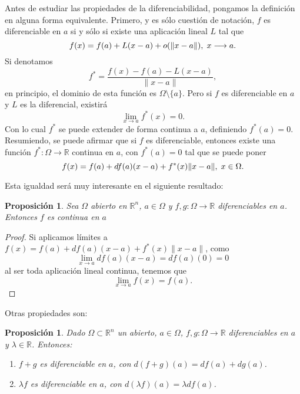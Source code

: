 \documentclass[12pt]{article}
\newtheorem{proposition}[theorem]{Proposición}
\providecommand{\norm}[1]{\lVert#1\rVert}
\begin{document}
Antes de estudiar las propiedades de la diferenciabilidad, pongamos la definición en alguna forma equivalente. Primero, y es sólo cuestión de notación, $f$ es diferenciable en $a$ si y sólo si existe una aplicación lineal $L$ tal que $$f(x)=f(a)+L(x-a)+o(\norm{x-a}), \hspace{0.1cm} x \longrightarrow a.$$
Si denotamos $$f^{\ast} = \dfrac{f(x)-f(a)-L(x-a)}{\norm{x-a}},$$ en principio, el dominio de esta función es $\Omega \setminus \lbrace a \rbrace$. Pero si $f$ es diferenciable en $a$ y $L$ es la diferencial, existirá $$\lim_{x \rightarrow a} f^{\ast}(x) = 0.$$ 
Con lo cual $f^{\ast}$ se puede extender de forma continua a $a$, definiendo $f^{\ast}(a)=0$. Resumiendo, se puede afirmar que si $f$ es diferenciable, entonces existe una función $f^{\ast} \colon \Omega \longrightarrow \mathbb{R}$ continua en $a$, con $f^{\ast}(a)=0$ tal que se puede poner $$f(x) = f(a) + df(a)(x-a) + f^{\ast}(x)\norm{x-a}, \hspace{0.1cm} x \in \Omega.$$

Esta igualdad será muy interesante en el siguiente resultado: 

\begin{proposition}
Sea $\Omega$ abierto en $\mathbb{R}^n$, $a \in \Omega$ y $f,g \colon \Omega \longrightarrow \mathbb{R}$ diferenciables en $a$. Entonces $f$ es continua en $a$
\end{proposition}
\begin{proof}
Si aplicamos límites a $f(x) = f(a) + df(a)(x-a) + f^{\ast}(x)\norm{x-a}$, como $$\lim_{x\rightarrow a} df(a)(x-a) = df(a)(0) = 0$$ al ser toda aplicación lineal continua, tenemos que $$\lim_{x\rightarrow a} f(x) = f(a).$$

\end{proof}

Otras propiedades son:

\begin{proposition}Dado $\Omega \subset \mathbb{R}^n$ un abierto, $a \in \Omega$, $f,g \colon \Omega \longrightarrow \mathbb{R}$ diferenciables en $a$ y $\lambda \in \mathbb{R}$. Entonces: 
\begin{enumerate}
\item $f+g$ es diferenciable en $a$, con $d(f+g)(a) = df(a) + dg(a)$.
\item $\lambda f$ es diferenciable en $a$, con $d(\lambda f) (a) = \lambda df(a)$.
\end{enumerate}
\end{proposition}
\end{document}

